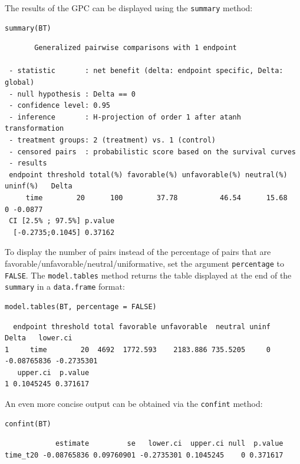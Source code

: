 \documentclass[12pt]{article}
\begin{document}
The results of the GPC can be displayed using the \texttt{summary} method:
\lstset{language=r,label= ,caption= ,captionpos=b,numbers=none}
\begin{lstlisting}
summary(BT)
\end{lstlisting}

\begin{verbatim}
       Generalized pairwise comparisons with 1 endpoint

 - statistic       : net benefit (delta: endpoint specific, Delta: global) 
 - null hypothesis : Delta == 0 
 - confidence level: 0.95 
 - inference       : H-projection of order 1 after atanh transformation 
 - treatment groups: 2 (treatment) vs. 1 (control) 
 - censored pairs  : probabilistic score based on the survival curves
 - results
 endpoint threshold total(%) favorable(%) unfavorable(%) neutral(%) uninf(%)   Delta
     time        20      100        37.78          46.54      15.68        0 -0.0877
 CI [2.5% ; 97.5%] p.value 
  [-0.2735;0.1045] 0.37162
\end{verbatim}

 To display the number of pairs instead of the percentage of pairs
that are favorable/unfavorable/neutral/uniformative, set the argument
\texttt{percentage} to \texttt{FALSE}. The \texttt{model.tables} method returns the table
displayed at the end of the \texttt{summary} in a \texttt{data.frame} format:
\lstset{language=r,label= ,caption= ,captionpos=b,numbers=none}
\begin{lstlisting}
model.tables(BT, percentage = FALSE)
\end{lstlisting}

\begin{verbatim}
  endpoint threshold total favorable unfavorable  neutral uninf       Delta   lower.ci
1     time        20  4692  1772.593    2183.886 735.5205     0 -0.08765836 -0.2735301
   upper.ci  p.value
1 0.1045245 0.371617
\end{verbatim}


\bigskip

An even more concise output can be obtained via the \texttt{confint} method:
\lstset{language=r,label= ,caption= ,captionpos=b,numbers=none}
\begin{lstlisting}
confint(BT)
\end{lstlisting}

\begin{verbatim}
            estimate         se   lower.ci  upper.ci null  p.value
time_t20 -0.08765836 0.09760901 -0.2735301 0.1045245    0 0.371617
\end{verbatim}
\end{document}

